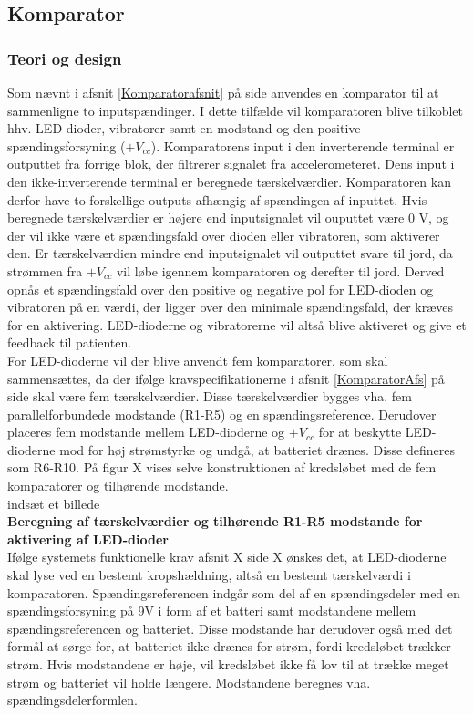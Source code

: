 \subsection{Komparator}
\subsubsection{Teori og design}
Som nævnt i afsnit \ref{Komparatorafsnit} på side \pageref{Komparatorafsnit} anvendes en komparator til at sammenligne to inputspændinger. I dette tilfælde vil komparatoren blive tilkoblet hhv. LED-dioder, vibratorer samt en modstand og den positive spændingsforsyning ($+V_{cc}$). Komparatorens input i den inverterende terminal er outputtet fra forrige blok, der filtrerer signalet fra accelerometeret. Dens input i den ikke-inverterende terminal er beregnede tærskelværdier. Komparatoren kan derfor have to forskellige outputs afhængig af spændingen af inputtet. Hvis beregnede tærskelværdier er højere end inputsignalet vil ouputtet være 0 V, og der vil ikke være et spændingsfald over dioden eller vibratoren, som aktiverer den. Er tærskelværdien mindre end inputsignalet vil outputtet svare til jord, da strømmen fra $+V_{cc}$ vil løbe igennem komparatoren og derefter til jord. Derved opnås et spændingsfald over den positive og negative pol for LED-dioden og vibratoren på en værdi, der ligger over den minimale spændingsfald, der kræves for en aktivering. LED-dioderne og vibratorerne vil altså blive aktiveret og give et feedback til patienten. \\
For LED-dioderne vil der blive anvendt fem komparatorer, som skal sammensættes, da der ifølge kravspecifikationerne i afsnit \ref{KomparatorAfs} på side \pageref{KomparatorAfs} skal være fem tærskelværdier. Disse tærskelværdier bygges vha. fem parallelforbundede modstande (R1-R5) og en spændingsreference. Derudover placeres fem modstande mellem LED-dioderne og $+V_{cc}$ for at beskytte LED-dioderne mod for høj strømstyrke og undgå, at batteriet drænes. Disse defineres som R6-R10. På figur X vises selve konstruktionen af kredsløbet med de fem komparatorer og tilhørende modstande. \\

indsæt et billede \\

\noindent\textbf{Beregning af tærskelværdier og tilhørende R1-R5 modstande for aktivering af LED-dioder} \\
Ifølge systemets funktionelle krav afsnit X side X ønskes det, at LED-dioderne skal lyse ved en bestemt kropshældning, altså en bestemt tærskelværdi i komparatoren. Spændingsreferencen indgår som del af en spændingsdeler med en spændingsforsyning på 9V i form af et batteri samt modstandene mellem spændingsreferencen og batteriet. Disse modstande har derudover også med det formål at sørge for, at batteriet ikke drænes for strøm, fordi kredsløbet trækker strøm. Hvis modstandene er høje, vil kredsløbet ikke få lov til at trække meget strøm og batteriet vil holde længere. Modstandene beregnes vha. spændingsdelerformlen. \\

